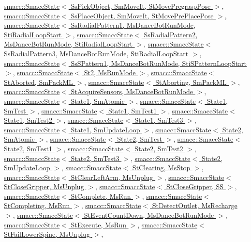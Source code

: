\hyperlink{classsmacc_1_1SmaccState}{smacc\+::\+Smacc\+State$<$ Ss\+Pick\+Object, Sm\+Move\+It, St\+Move\+Pregrasp\+Pose $>$}, \hyperlink{classsmacc_1_1SmaccState}{smacc\+::\+Smacc\+State$<$ Ss\+Place\+Object, Sm\+Move\+It, St\+Move\+Pre\+Place\+Pose $>$}, \hyperlink{classsmacc_1_1SmaccState}{smacc\+::\+Smacc\+State$<$ Ss\+Radial\+Pattern1, Ms\+Dance\+Bot\+Run\+Mode, Sti\+Radial\+Loop\+Start $>$}, \hyperlink{classsmacc_1_1SmaccState}{smacc\+::\+Smacc\+State$<$ Ss\+Radial\+Pattern2, Ms\+Dance\+Bot\+Run\+Mode, Sti\+Radial\+Loop\+Start $>$}, \hyperlink{classsmacc_1_1SmaccState}{smacc\+::\+Smacc\+State$<$ Ss\+Radial\+Pattern3, Ms\+Dance\+Bot\+Run\+Mode, Sti\+Radial\+Loop\+Start $>$}, \hyperlink{classsmacc_1_1SmaccState}{smacc\+::\+Smacc\+State$<$ Ss\+S\+Pattern1, Ms\+Dance\+Bot\+Run\+Mode, Sti\+S\+Pattern\+Loop\+Start $>$}, \hyperlink{classsmacc_1_1SmaccState}{smacc\+::\+Smacc\+State$<$ St2, Ms\+Run\+Mode $>$}, \hyperlink{classsmacc_1_1SmaccState}{smacc\+::\+Smacc\+State$<$ St\+Aborted, Sm\+Pack\+M\+L $>$}, \hyperlink{classsmacc_1_1SmaccState}{smacc\+::\+Smacc\+State$<$ St\+Aborting, Sm\+Pack\+M\+L $>$}, \hyperlink{classsmacc_1_1SmaccState}{smacc\+::\+Smacc\+State$<$ St\+Acquire\+Sensors, Ms\+Dance\+Bot\+Run\+Mode $>$}, \hyperlink{classsmacc_1_1SmaccState}{smacc\+::\+Smacc\+State$<$ State1, Sm\+Atomic $>$}, \hyperlink{classsmacc_1_1SmaccState}{smacc\+::\+Smacc\+State$<$ State1, Sm\+Test $>$}, \hyperlink{classsmacc_1_1SmaccState}{smacc\+::\+Smacc\+State$<$ State1, Sm\+Test1 $>$}, \hyperlink{classsmacc_1_1SmaccState}{smacc\+::\+Smacc\+State$<$ State1, Sm\+Test2 $>$}, \hyperlink{classsmacc_1_1SmaccState}{smacc\+::\+Smacc\+State$<$ State1, Sm\+Test3 $>$}, \hyperlink{classsmacc_1_1SmaccState}{smacc\+::\+Smacc\+State$<$ State1, Sm\+Update\+Loop $>$}, \hyperlink{classsmacc_1_1SmaccState}{smacc\+::\+Smacc\+State$<$ State2, Sm\+Atomic $>$}, \hyperlink{classsmacc_1_1SmaccState}{smacc\+::\+Smacc\+State$<$ State2, Sm\+Test $>$}, \hyperlink{classsmacc_1_1SmaccState}{smacc\+::\+Smacc\+State$<$ State2, Sm\+Test1 $>$}, \hyperlink{classsmacc_1_1SmaccState}{smacc\+::\+Smacc\+State$<$ State2, Sm\+Test2 $>$}, \hyperlink{classsmacc_1_1SmaccState}{smacc\+::\+Smacc\+State$<$ State2, Sm\+Test3 $>$}, \hyperlink{classsmacc_1_1SmaccState}{smacc\+::\+Smacc\+State$<$ State2, Sm\+Update\+Loop $>$}, \hyperlink{classsmacc_1_1SmaccState}{smacc\+::\+Smacc\+State$<$ St\+Clearing, Ms\+Stop $>$}, \hyperlink{classsmacc_1_1SmaccState}{smacc\+::\+Smacc\+State$<$ St\+Clear\+Left\+Arm, Ms\+Unplug $>$}, \hyperlink{classsmacc_1_1SmaccState}{smacc\+::\+Smacc\+State$<$ St\+Close\+Gripper, Ms\+Unplug $>$}, \hyperlink{classsmacc_1_1SmaccState}{smacc\+::\+Smacc\+State$<$ St\+Close\+Gripper, S\+S $>$}, \hyperlink{classsmacc_1_1SmaccState}{smacc\+::\+Smacc\+State$<$ St\+Complete, Ms\+Run $>$}, \hyperlink{classsmacc_1_1SmaccState}{smacc\+::\+Smacc\+State$<$ St\+Completing, Ms\+Run $>$}, \hyperlink{classsmacc_1_1SmaccState}{smacc\+::\+Smacc\+State$<$ St\+Detect\+Outlet, Ms\+Recharge $>$}, \hyperlink{classsmacc_1_1SmaccState}{smacc\+::\+Smacc\+State$<$ St\+Event\+Count\+Down, Ms\+Dance\+Bot\+Run\+Mode $>$}, \hyperlink{classsmacc_1_1SmaccState}{smacc\+::\+Smacc\+State$<$ St\+Execute, Ms\+Run $>$}, \hyperlink{classsmacc_1_1SmaccState}{smacc\+::\+Smacc\+State$<$ St\+Fail\+Lower\+Spine, Ms\+Unplug $>$}, 